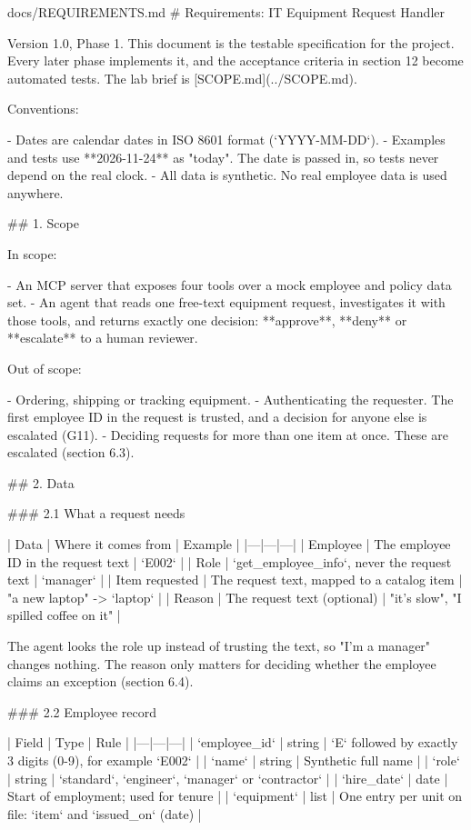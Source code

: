 \documentclass[11pt,letterpaper]{article}
\renewcommand{\_}{\textunderscore\allowbreak}
\begin{document}
\begin{appendixpromptbox}{docs/REQUIREMENTS.md}
# Requirements: IT Equipment Request Handler

Version 1.0, Phase 1. This document is the testable specification for the project. Every later
phase implements it, and the acceptance criteria in section 12 become automated tests. The lab
brief is [SCOPE.md](../SCOPE.md).

Conventions:

- Dates are calendar dates in ISO 8601 format (`YYYY-MM-DD`).
- Examples and tests use **2026-11-24** as "today". The date is passed in, so tests never depend
  on the real clock.
- All data is synthetic. No real employee data is used anywhere.

## 1. Scope

In scope:

- An MCP server that exposes four tools over a mock employee and policy data set.
- An agent that reads one free-text equipment request, investigates it with those tools, and
  returns exactly one decision: **approve**, **deny** or **escalate** to a human reviewer.

Out of scope:

- Ordering, shipping or tracking equipment.
- Authenticating the requester. The first employee ID in the request is trusted, and a decision
  for anyone else is escalated (G11).
- Deciding requests for more than one item at once. These are escalated (section 6.3).

## 2. Data

### 2.1 What a request needs

| Data | Where it comes from | Example |
|---|---|---|
| Employee | The employee ID in the request text | `E002` |
| Role | `get_employee_info`, never the request text | `manager` |
| Item requested | The request text, mapped to a catalog item | "a new laptop" -> `laptop` |
| Reason | The request text (optional) | "it's slow", "I spilled coffee on it" |

The agent looks the role up instead of trusting the text, so "I'm a manager" changes nothing. The
reason only matters for deciding whether the employee claims an exception (section 6.4).

### 2.2 Employee record

| Field | Type | Rule |
|---|---|---|
| `employee_id` | string | `E` followed by exactly 3 digits (0-9), for example `E002` |
| `name` | string | Synthetic full name |
| `role` | string | `standard`, `engineer`, `manager` or `contractor` |
| `hire_date` | date | Start of employment; used for tenure |
| `equipment` | list | One entry per unit on file: `item` and `issued_on` (date) |


\end{appendixpromptbox}
\end{document}
